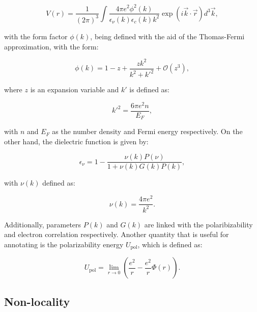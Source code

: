 \documentclass[openany]{book}
\begin{document}
\begin{equation}\label{eq:potential_screening_fourier}
	V(r) = \frac{1}{(2\pi)^3} \int \frac{4\pi e^2 \phi^2(k)}{\epsilon_\nu (k) \epsilon_c (k) k^2} \exp(i \vec k \cdot \vec r) d^3 \vec k,
\end{equation}

with the form factor $\phi(k)$, being defined with the aid of the Thomas-Fermi approximation, with the form: 

\begin{equation}\label{eq:potential_screening_formFactor}
	\phi(k) = 1 - z + \frac{zk^2}{k^2 + {k'}^2} + \mathcal{O}(z^3),
\end{equation}

where $z$ is an expansion variable and $k'$ is defined as: 

\begin{equation}\label{eq:potential_screening_kThomasFermi}
	{k'}^2 = \frac{6\pi e^2 n}{E_F},
\end{equation}

with $n$ and $E_F$ as the number density and Fermi energy respectively. On the other hand, the dielectric function is given by:

\begin{equation}\label{eq:potential_screening_dielectric}
	\epsilon_\nu = 1 - \frac{\nu(k) P(\nu)}{1 + \nu(k) G(k) P(k)},
\end{equation}

with $\nu(k)$ defined as: 

\begin{equation}\label{eq:potential_screening_nu}
	\nu(k) = \frac{4\pi e^2}{k^2}.
\end{equation}

Additionally, parameters $P(k)$ and $G(k)$ are linked with the polaribizability and electron correlation respectively. Another quantity that is useful for annotating is the polarizability energy $U_{\mathrm{pol}}$, which is defined as: 

\begin{equation}\label{eq:potential_screening_Upolarizability}
	U_{\mathrm{pol}} = \lim_{r \rightarrow 0 } {\left(\frac{e^2}{r} - \frac{e^2}{r} \Phi(r) \right)}.
\end{equation}


\subsection{Non-locality}  \label{sub:potential_nonlocality}
\end{document}
